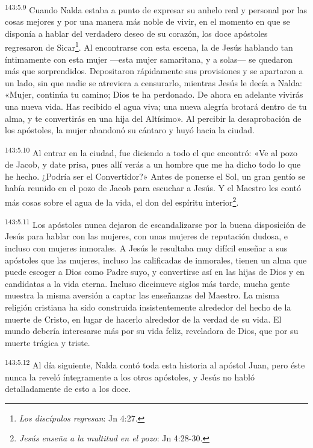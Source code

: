 \par 
\textsuperscript{143:5.9} Cuando Nalda estaba a punto de expresar su anhelo real y personal por las cosas mejores y por una manera más noble de vivir, en el momento en que se disponía a hablar del verdadero deseo de su corazón, los doce apóstoles regresaron de Sicar\footnote{\textit{Los discípulos regresan}: Jn 4:27.}. Al encontrarse con esta escena, la de Jesús hablando tan íntimamente con esta mujer ---esta mujer samaritana, y a solas--- se quedaron más que sorprendidos. Depositaron rápidamente sus provisiones y se apartaron a un lado, sin que nadie se atreviera a censurarlo, mientras Jesús le decía a Nalda: «Mujer, continúa tu camino; Dios te ha perdonado. De ahora en adelante vivirás una nueva vida. Has recibido el agua viva; una nueva alegría brotará dentro de tu alma, y te convertirás en una hija del Altísimo». Al percibir la desaprobación de los apóstoles, la mujer abandonó su cántaro y huyó hacia la ciudad.

\par 
\textsuperscript{143:5.10} Al entrar en la ciudad, fue diciendo a todo el que encontró: «Ve al pozo de Jacob, y date prisa, pues allí verás a un hombre que me ha dicho todo lo que he hecho. ¿Podría ser el Convertidor?» Antes de ponerse el Sol, un gran gentío se había reunido en el pozo de Jacob para escuchar a Jesús. Y el Maestro les contó más cosas sobre el agua de la vida, el don del espíritu interior\footnote{\textit{Jesús enseña a la multitud en el pozo}: Jn 4:28-30.}.

\par 
\textsuperscript{143:5.11} Los apóstoles nunca dejaron de escandalizarse por la buena disposición de Jesús para hablar con las mujeres, con unas mujeres de reputación dudosa, e incluso con mujeres inmorales. A Jesús le resultaba muy difícil enseñar a sus apóstoles que las mujeres, incluso las calificadas de inmorales, tienen un alma que puede escoger a Dios como Padre suyo, y convertirse así en las hijas de Dios y en candidatas a la vida eterna. Incluso diecinueve siglos más tarde, mucha gente muestra la misma aversión a captar las enseñanzas del Maestro. La misma religión cristiana ha sido construida insistentemente alrededor del hecho de la muerte de Cristo, en lugar de hacerlo alrededor de la verdad de su vida. El mundo debería interesarse más por su vida feliz, reveladora de Dios, que por su muerte trágica y triste.

\par 
\textsuperscript{143:5.12} Al día siguiente, Nalda contó toda esta historia al apóstol Juan, pero éste nunca la reveló íntegramente a los otros apóstoles, y Jesús no habló detalladamente de esto a los doce.


